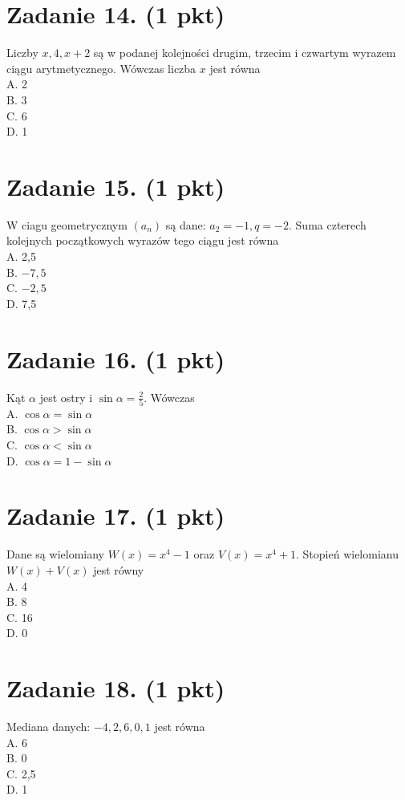 \documentclass[10pt]{article}
\begin{document}
\section*{Zadanie 14. (1 pkt)}
Liczby \(x, 4, x+2\) są w podanej kolejności drugim, trzecim i czwartym wyrazem ciągu arytmetycznego. Wówczas liczba \(x\) jest równa\\
A. 2\\
B. 3\\
C. 6\\
D. 1

\section*{Zadanie 15. (1 pkt)}
W ciagu geometrycznym \(\left(a_{n}\right)\) są dane: \(a_{2}=-1, q=-2\). Suma czterech kolejnych początkowych wyrazów tego ciągu jest równa\\
A. 2,5\\
B. \(-7,5\)\\
C. \(-2,5\)\\
D. 7,5

\section*{Zadanie 16. (1 pkt)}
Kąt \(\alpha\) jest ostry i \(\sin \alpha=\frac{2}{5}\). Wówczas\\
A. \(\cos \alpha=\sin \alpha\)\\
B. \(\cos \alpha>\sin \alpha\)\\
C. \(\cos \alpha<\sin \alpha\)\\
D. \(\cos \alpha=1-\sin \alpha\)

\section*{Zadanie 17. (1 pkt)}
Dane są wielomiany \(W(x)=x^{4}-1\) oraz \(V(x)=x^{4}+1\). Stopień wielomianu \(W(x)+V(x)\) jest równy\\
A. 4\\
B. 8\\
C. 16\\
D. 0

\section*{Zadanie 18. (1 pkt)}
Mediana danych: \(-4,2,6,0,1\) jest równa\\
A. 6\\
B. 0\\
C. 2,5\\
D. 1
\end{document}

